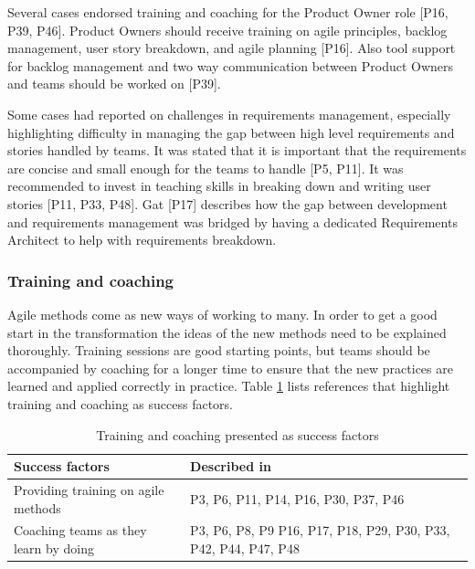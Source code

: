 \documentclass[preprint,authoryear,12pt]{elsarticle}
\begin{document}
Several cases endorsed training and coaching for the Product Owner role [P16,
P39, P46]. Product Owners should receive training on agile principles, backlog
management, user story breakdown, and agile planning [P16]. Also tool support
for backlog management and two way communication between Product Owners and
teams should be worked on [P39].


Some cases had reported on challenges in requirements management, especially
highlighting difficulty in managing the gap between high level requirements and
stories handled by teams. It was stated that it is important that the
requirements are concise and small enough for the teams to handle [P5, P11].
It was recommended to invest in teaching skills in breaking down and writing
user stories [P11, P33, P48]. Gat [P17] describes how the gap between
development and requirements management was bridged by having a dedicated
Requirements Architect to help with requirements breakdown.


\subsubsection{Training and coaching}

Agile methods come as new ways of working to many. In order to get a good start
in the transformation the ideas of the new methods need to be explained
thoroughly. Training sessions are good starting points, but teams should be
accompanied by coaching for a longer time to ensure that the new practices are
learned and applied correctly in practice. Table \ref{table:success_training}
lists references that highlight training and coaching as success factors.

\begin{table}[h]
    \centering
    \begin{tabular}{ >{\raggedright\arraybackslash}p{}
                     >{\raggedright\arraybackslash}p{} }
        \toprule
        Success factors  &  Described in \\
        \midrule
        Providing training on agile methods  &
                P3, P6, P11, P14, P16, P30, P37, P46 \\
        Coaching teams as they learn by doing  &
                P3, P6, P8, P9 P16, P17, P18, P29,
                P30, P33, P42, P44, P47, P48  \\
        \bottomrule
    \end{tabular}
    \caption{Training and coaching presented as success factors}
    \label{table:success_training}
\end{table}
\end{document}
